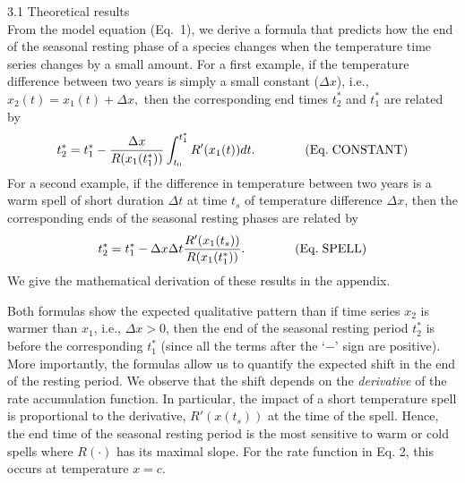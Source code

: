 \documentclass[11pt,letterpaper]{article}
\author{Frithjof Lutscher}
\begin{document}
3.1 Theoretical results\\


From the model equation (Eq.~1), we derive a formula that predicts how the end of the seasonal resting phase of a species changes when the temperature time series changes by a small amount. For a first example, if the temperature difference between two years is simply a small constant ($\Delta x$), i.e., 
$
x_2(t) = x_1(t) + \Delta x,
$
then the corresponding end times $t_2^*$ and $t_1^*$ are related by
\[
t_2^* = t_1^* - \frac{\Delta x}{R(x_1(t_1^*))}\int_{t_0}^{t_1^*} R'(x_1(t))dt.\qquad\qquad ({\rm Eq. \; CONSTANT})
\] 
For a second example, if the difference in temperature between two years is a warm spell of short duration $\Delta t$ at time $t_s$ of temperature difference $\Delta x$, then the corresponding ends of the seasonal resting phases are related by
\[
t_2^* = t_1^* - {\Delta x \Delta t}\frac{R'(x_1(t_s))}{R(x_1(t_1^*))}. \qquad\qquad ({\rm Eq. \; SPELL})
\] 
We give the mathematical derivation of these results in the appendix. 

Both formulas show the expected qualitative pattern than if time series $x_2$ is warmer than $x_1$, i.e., $\Delta x>0$, then the end of the seasonal resting period $t_2^*$ is before the corresponding $t_1^*$ (since all the terms after the `$-$' sign are positive). More importantly, the formulas allow us to quantify the expected shift in the end of the resting period. We observe that the shift depends on the {\em derivative} of the rate accumulation function. In particular, the impact of a short temperature spell is proportional to the derivative, $R'(x(t_s))$ at the time of the spell. Hence, the end time of the seasonal resting period is the most sensitive to warm or cold spells where $R(\cdot)$ has its maximal slope. For the rate function in Eq. 2, this occurs at temperature $x=c$. 
\end{document}
